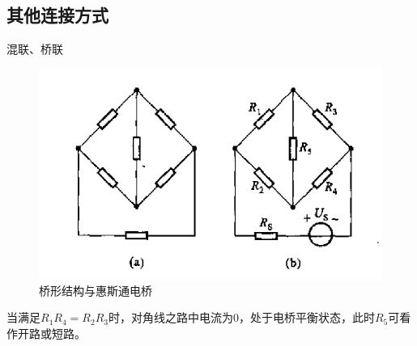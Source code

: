 \documentclass[11pt,a4paper,oneside]{book}
\begin{document}
\subsection{其他连接方式}
混联、桥联
\begin{figure}[H]
	\centering
	\includegraphics[width=0.4\linewidth]{screenshot132}
	\caption{桥形结构与惠斯通电桥}
	\label{fig:screenshot132}
\end{figure}
当满足$R_1R_4=R_2R_3$时，对角线之路中电流为0，处于电桥平衡状态，此时$R_5$可看作开路或短路。
\end{document}
